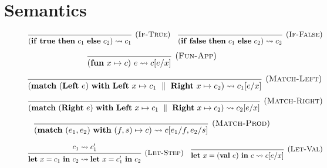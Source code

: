 \documentclass[class=article, crop=false]{standalone}
\begin{document}
\section{Semantics}
\begin{figure}[H]
    $$
    \begin{prooftree}
    \hypo{}
    \infer1[(\textsc{If-True})]{\left( \effIf \effTrue \effThen c_1 \effElse c_2 \right) \leadsto c_1}
    \end{prooftree}
    \quad
    \begin{prooftree}
      \hypo{}
      \infer1[(\textsc{If-False})]{\left( \effIf \effFalse \effThen c_1 \effElse c_2 \right) \leadsto c_2}
    \end{prooftree}
    $$
    
    $$
    \begin{prooftree}
      \hypo{}
      \infer1[(\textsc{Fun-App})]{(\effFun x \mapsto c)\ e \leadsto c[e/x]}
    \end{prooftree}
    $$

    $$
    \begin{prooftree}
      \hypo{}
      \infer1[(\textsc{Match-Left})]{\left( \effMatch (\effLeft e)\ \effWith \effLeft x \mapsto c_1 \dmid \effRight x \mapsto c_2 \right)  \leadsto c_1[e/x]}
    \end{prooftree}
    $$
    
    $$
    \begin{prooftree}
      \hypo{}
      \infer1[(\textsc{Match-Right})]{\left( \effMatch (\effRight e)\ \effWith \effLeft x \mapsto c_1 \dmid \effRight x \mapsto c_2 \right)  \leadsto c_2[e/x]}
    \end{prooftree}
    $$
    
    $$
    \begin{prooftree}
      \hypo{}
      \infer1[(\textsc{Match-Prod})]{\left( \effMatch (e_1, e_2)\ \effWith (f,s) \mapsto c \right) \leadsto c[e_1/f, e_2/s]}
    \end{prooftree}
    $$
    
    $$
    \begin{prooftree}
      \hypo{c_1 \leadsto c_1'}
      \infer1[(\textsc{Let-Step})]{\effLet x = c_1 \effIn c_2 \leadsto \effLet x = c_1' \effIn c_2}
    \end{prooftree}
    \quad
    \begin{prooftree}
      \hypo{}
      \infer1[(\textsc{Let-Val})]{\effLet x = (\effVal e) \effIn c \leadsto c[e/x]}
    \end{prooftree}
    $$
    

\end{figure}
\end{document}
